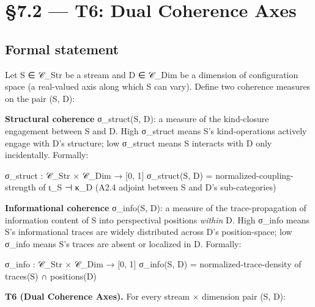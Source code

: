 \documentclass[11pt, openany]{book}
\begin{document}
\section{§7.2 --- T6: Dual Coherence Axes}

\subsection{Formal statement}

Let S ∈ 𝒞\_\allowbreak{}Str be a stream and D ∈ 𝒞\_\allowbreak{}Dim be a dimension of configuration space (a real-valued axis along which S can vary). Define two coherence measures on the pair (S, D):

\textbf{Structural coherence} σ\_\allowbreak{}struct(S, D): a measure of the kind-closure engagement between S and D. High σ\_\allowbreak{}struct means S's kind-operations actively engage with D's structure; low σ\_\allowbreak{}struct means S interacts with D only incidentally. Formally:

\begin{Code}
σ_struct : 𝒞_Str × 𝒞_Dim → [0, 1]
σ_struct(S, D) = normalized-coupling-strength of ι_S ⊣ κ_D (A2.4 adjoint between S and D's sub-categories)
\end{Code}

\textbf{Informational coherence} σ\_\allowbreak{}info(S, D): a measure of the trace-propagation of information content of S into perspectival positions \textit{within} D. High σ\_\allowbreak{}info means S's informational traces are widely distributed across D's position-space; low σ\_\allowbreak{}info means S's traces are absent or localized in D. Formally:

\begin{Code}
σ_info : 𝒞_Str × 𝒞_Dim → [0, 1]
σ_info(S, D) = normalized-trace-density of traces(S) ∩ positions(D)
\end{Code}

\textbf{T6 (Dual Coherence Axes).} For every stream × dimension pair (S, D):
\end{document}
